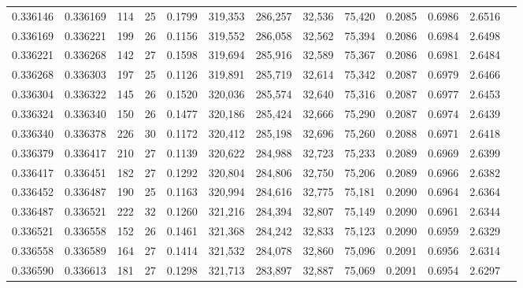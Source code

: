 \begin{tabular}{rrrrrrrrrrrrr}
0.336146 & 0.336169 &   114 &  25 &                                     0.1799 & 319,353 & 286,257 &  32,536 &  75,420 & 0.2085 & 0.6986 & 2.6516 \\
0.336169 & 0.336221 &   199 &  26 &                                     0.1156 & 319,552 & 286,058 &  32,562 &  75,394 & 0.2086 & 0.6984 & 2.6498 \\
0.336221 & 0.336268 &   142 &  27 &                                     0.1598 & 319,694 & 285,916 &  32,589 &  75,367 & 0.2086 & 0.6981 & 2.6484 \\
0.336268 & 0.336303 &   197 &  25 &                                     0.1126 & 319,891 & 285,719 &  32,614 &  75,342 & 0.2087 & 0.6979 & 2.6466 \\
0.336304 & 0.336322 &   145 &  26 &                                     0.1520 & 320,036 & 285,574 &  32,640 &  75,316 & 0.2087 & 0.6977 & 2.6453 \\
0.336324 & 0.336340 &   150 &  26 &                                     0.1477 & 320,186 & 285,424 &  32,666 &  75,290 & 0.2087 & 0.6974 & 2.6439 \\
0.336340 & 0.336378 &   226 &  30 &                                     0.1172 & 320,412 & 285,198 &  32,696 &  75,260 & 0.2088 & 0.6971 & 2.6418 \\
0.336379 & 0.336417 &   210 &  27 &                                     0.1139 & 320,622 & 284,988 &  32,723 &  75,233 & 0.2089 & 0.6969 & 2.6399 \\
0.336417 & 0.336451 &   182 &  27 &                                     0.1292 & 320,804 & 284,806 &  32,750 &  75,206 & 0.2089 & 0.6966 & 2.6382 \\
0.336452 & 0.336487 &   190 &  25 &                                     0.1163 & 320,994 & 284,616 &  32,775 &  75,181 & 0.2090 & 0.6964 & 2.6364 \\
0.336487 & 0.336521 &   222 &  32 &                                     0.1260 & 321,216 & 284,394 &  32,807 &  75,149 & 0.2090 & 0.6961 & 2.6344 \\
0.336521 & 0.336558 &   152 &  26 &                                     0.1461 & 321,368 & 284,242 &  32,833 &  75,123 & 0.2090 & 0.6959 & 2.6329 \\
0.336558 & 0.336589 &   164 &  27 &                                     0.1414 & 321,532 & 284,078 &  32,860 &  75,096 & 0.2091 & 0.6956 & 2.6314 \\
0.336590 & 0.336613 &   181 &  27 &                                     0.1298 & 321,713 & 283,897 &  32,887 &  75,069 & 0.2091 & 0.6954 & 2.6297 \\

\end{tabular}
